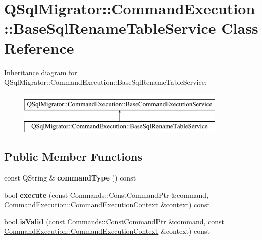 \hypertarget{class_q_sql_migrator_1_1_command_execution_1_1_base_sql_rename_table_service}{}\section{Q\+Sql\+Migrator\+:\+:Command\+Execution\+:\+:Base\+Sql\+Rename\+Table\+Service Class Reference}
\label{class_q_sql_migrator_1_1_command_execution_1_1_base_sql_rename_table_service}
Inheritance diagram for Q\+Sql\+Migrator\+:\+:Command\+Execution\+:\+:Base\+Sql\+Rename\+Table\+Service\+:\begin{figure}[H]
\begin{center}
\leavevmode
\includegraphics[height=2.000000cm]{class_q_sql_migrator_1_1_command_execution_1_1_base_sql_rename_table_service}
\end{center}
\end{figure}
\subsection*{Public Member Functions}
\begin{DoxyCompactItemize}
\item 
\mbox{\label{class_q_sql_migrator_1_1_command_execution_1_1_base_sql_rename_table_service_a28a6819635774c94918b66cde14d0be8}} 
const Q\+String \& {\bfseries command\+Type} () const
\item 
\mbox{\label{class_q_sql_migrator_1_1_command_execution_1_1_base_sql_rename_table_service_adf78e320b70ceb6e2ee8f37d31bbe2cd}} 
bool {\bfseries execute} (const Commands\+::\+Const\+Command\+Ptr \&command, \hyperlink{class_q_sql_migrator_1_1_command_execution_1_1_command_execution_context}{Command\+Execution\+::\+Command\+Execution\+Context} \&context) const
\item 
\mbox{\label{class_q_sql_migrator_1_1_command_execution_1_1_base_sql_rename_table_service_af8ac85be5575eb1c0e7fdd6f3f068852}} 
bool {\bfseries is\+Valid} (const Commands\+::\+Const\+Command\+Ptr \&command, const \hyperlink{class_q_sql_migrator_1_1_command_execution_1_1_command_execution_context}{Command\+Execution\+::\+Command\+Execution\+Context} \&context) const
\end{DoxyCompactItemize}
